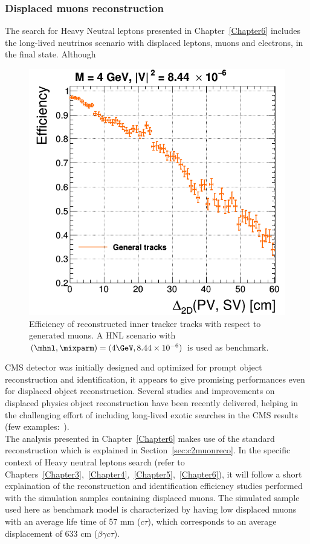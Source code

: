 \clearpage
\subsubsection{Displaced muons
  reconstruction}\label{sec:c2muondisplaced}
The search for Heavy Neutral leptons presented in
Chapter~\ref{Chapter6} includes the long-lived neutrinos scenario with
displaced leptons, muons and electrons, in the final
state. Although
\begin{figure}
\includegraphics[width=.40\textwidth]{Figures/c6/object/tracking_M-4_V-0p00290516780927_rho.png}
  \caption{Efficiency of reconstructed inner tracker tracks with
    respect to generated muons. A HNL scenario with
    $(\mhnl,\mixparm)=(4\GeV,8.44\times10^{-6})$ is used as
    benchmark. \dani}
  \label{fig:c2tracking}
\end{figure}
 CMS detector was initially designed and optimized for prompt
object reconstruction and identification, it appears to give
promising performances even for displaced object
reconstruction. Several studies and improvements on displaced physics object
reconstruction have been recently
delivered, helping in the challenging effort of including long-lived
exotic searches in the CMS results (few
examples:~\cite{cmscollaboration2021search, Sirunyan_2019ll,
  Sirunyan_2019ll2, Sirunyan_2020ll, Sirunyan_2021ll,CMS:2021tkn}).\\

The analysis presented in Chapter~\ref{Chapter6} makes use of the
standard reconstruction which
 is explained in
Section~\ref{sec:c2muonreco}. In the specific context of Heavy
neutral leptons search (refer to
Chapters~\ref{Chapter3},~\ref{Chapter4},~\ref{Chapter5},~\ref{Chapter6}),
it will follow a short explaination of the reconstruction and
identification efficiency studies performed with the simulation
samples containing displaced muons. The simulated sample used here as
benchmark model is characterized by having low \pt displaced muons with an
average life time of 57 mm ($c\tau$), which corresponds to an average
displacement of 633 cm ($\beta \gamma c \tau$).

